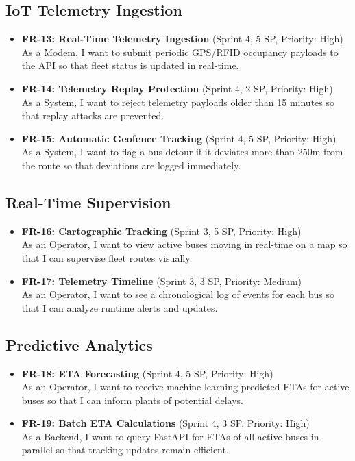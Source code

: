 \subsection{IoT Telemetry Ingestion}
\begin{itemize}
  \item \textbf{FR-13: Real-Time Telemetry Ingestion} (Sprint 4, 5 SP, Priority: High) \\
  As a Modem, I want to submit periodic GPS/RFID occupancy payloads to the API so that fleet status is updated in real-time.
  \item \textbf{FR-14: Telemetry Replay Protection} (Sprint 4, 2 SP, Priority: High) \\
  As a System, I want to reject telemetry payloads older than 15 minutes so that replay attacks are prevented.
  \item \textbf{FR-15: Automatic Geofence Tracking} (Sprint 4, 5 SP, Priority: High) \\
  As a System, I want to flag a bus detour if it deviates more than 250m from the route so that deviations are logged immediately.
\end{itemize}

\subsection{Real-Time Supervision}
\begin{itemize}
  \item \textbf{FR-16: Cartographic Tracking} (Sprint 3, 5 SP, Priority: High) \\
  As an Operator, I want to view active buses moving in real-time on a map so that I can supervise fleet routes visually.
  \item \textbf{FR-17: Telemetry Timeline} (Sprint 3, 3 SP, Priority: Medium) \\
  As an Operator, I want to see a chronological log of events for each bus so that I can analyze runtime alerts and updates.
\end{itemize}

\subsection{Predictive Analytics}
\begin{itemize}
  \item \textbf{FR-18: ETA Forecasting} (Sprint 4, 5 SP, Priority: High) \\
  As an Operator, I want to receive machine-learning predicted ETAs for active buses so that I can inform plants of potential delays.
  \item \textbf{FR-19: Batch ETA Calculations} (Sprint 4, 3 SP, Priority: High) \\
  As a Backend, I want to query FastAPI for ETAs of all active buses in parallel so that tracking updates remain efficient.
\end{itemize}

